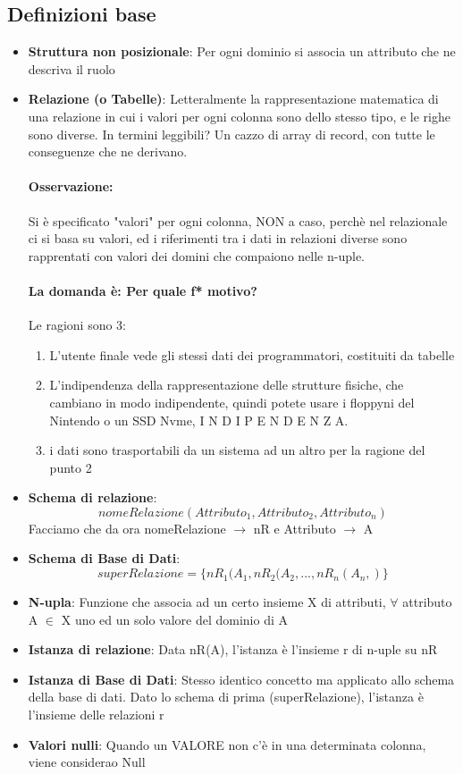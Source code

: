 \documentclass[12pt, a4paper, openany, twoside]{book}
\begin{document}
\subsection{Definizioni base}
\begin{itemize}
	\item \textbf{Struttura non posizionale}: Per ogni dominio si associa un attributo
	che ne descriva il ruolo
	\item \textbf{Relazione (o Tabelle)}: Letteralmente la rappresentazione
	matematica di una relazione in cui i valori per ogni colonna sono dello
	stesso tipo, e le righe sono diverse. In termini leggibili? Un cazzo di array 
	di record, con tutte le conseguenze che ne derivano.
	\paragraph{Osservazione:} Si è specificato "valori" per ogni colonna, NON a
	caso, perchè nel relazionale ci si basa su valori, ed i riferimenti tra i 
	dati in relazioni diverse sono rapprentati con valori dei domini che 
	compaiono nelle n-uple.
	\paragraph{La domanda è: Per quale f* motivo?} Le ragioni sono 3:
	\begin{enumerate}
		\item L'utente finale vede gli stessi dati dei programmatori, costituiti
		da tabelle
		\item L'indipendenza della rappresentazione delle strutture fisiche, 
		che cambiano in modo indipendente, quindi potete usare i floppyni del
		Nintendo o un SSD Nvme, I N D I P E N D E N Z A.
		\item i dati sono trasportabili da un sistema ad un altro per la ragione
		del punto 2
	\end{enumerate}
	\item \textbf{Schema di relazione}:
	\[
		nomeRelazione(Attributo_{1}, Attributo_{2}, Attributo_{n})
	\]	
	Facciamo che da ora nomeRelazione $\to$ nR e Attributo $\to$ A
	\item \textbf{Schema di Base di Dati}:
	\[
		superRelazione = \{nR_{1}(A_{1}, nR_{2}(A_{2}, ..., nR_{n}(A_{n}, )\}
	\]
	\item \textbf{N-upla}: Funzione che associa ad un certo insieme X di attributi,
	$\forall$ attributo A $\in$ X uno ed un solo valore del dominio di A
	\item \textbf{Istanza di relazione}: Data nR(A), l'istanza è l'insieme r di
	n-uple su nR
	\item \textbf{Istanza di Base di Dati}: Stesso identico concetto ma applicato
	allo schema della base di dati. Dato lo schema di prima (superRelazione),
	l'istanza è l'insieme delle relazioni r
	\item \textbf{Valori nulli}: Quando un VALORE non c'è in una determinata
	colonna, viene considerao Null 
\end{itemize}
\end{document}
